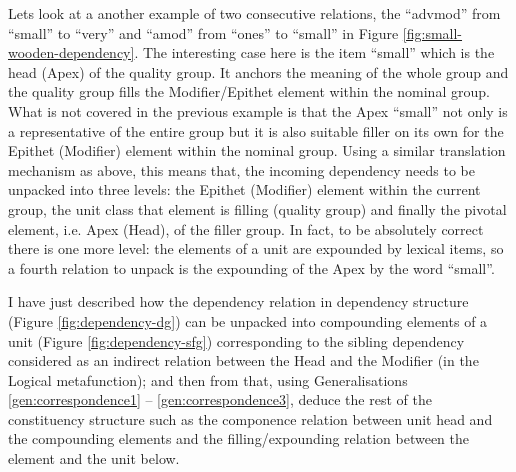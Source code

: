     Lets look at a another example of two consecutive relations, the ``advmod'' from ``small'' to ``very'' and ``amod'' from ``ones'' to ``small'' in Figure \ref{fig:small-wooden-dependency}. The interesting case here is the item ``small'' which is the head (Apex) of the quality group. It anchors the meaning of the whole group and the quality group fills the Modifier/Epithet element within the nominal group. What is not covered in the previous example is that the Apex ``small'' not only is a representative of the entire group but it is also suitable filler on its own for the Epithet (Modifier) element within the nominal group. Using a similar translation mechanism as above, this means that, the incoming dependency needs to be unpacked into three levels: the Epithet (Modifier) element within the current group, the unit class that element is filling (quality group) and finally the pivotal element, i.e. Apex (Head), of the filler group. In fact, to be absolutely correct there is one more level: the elements of a unit are expounded by lexical items, so a fourth relation to unpack is the expounding of the Apex by the word ``small''.

    I have just described how the dependency relation in dependency structure (Figure \ref{fig:dependency-dg}) can be unpacked into compounding elements of a unit (Figure \ref{fig:dependency-sfg}) corresponding to the sibling dependency considered as an indirect relation between the Head and the Modifier (in the Logical metafunction); and then from that, using Generalisations \ref{gen:correspondence1} -- \ref{gen:correspondence3}, deduce the rest of the constituency structure such as the componence relation between unit head and the compounding elements and the filling/expounding relation between the element and the unit below. 


